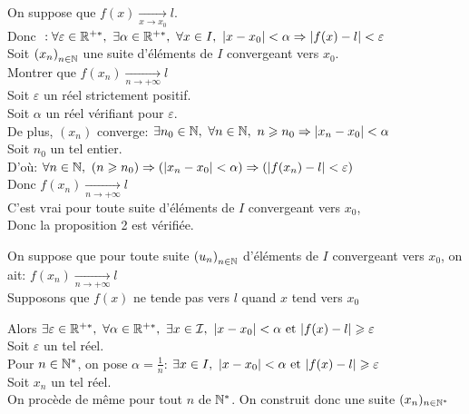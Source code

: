 \documentclass[12pt,twoside,a4paper]{article}
\begin{document}
		\begin{preuve}
			\begin{liste}
				\item On suppose que $f(x)\mathop{\longrightarrow}\limits_{x\rightarrow x_0} l$.\\
					Donc $\ :\forall \varepsilon \in\R^{+*},\ \exists\alpha\in\R^{+*},\ \forall x\in I,\ |x-x_0|<\alpha\Rightarrow |f(x)-l|<\varepsilon$\\
					Soit $\left( x_n\right) _{n\in\mathbb{N}}$ une suite d'\'el\'ements de $I$ convergeant vers $x_0$.\\
					Montrer que $f\left( x_n\right) \mathop{\longrightarrow}\limits_{n\rightarrow +\infty}l$\\
					Soit $\varepsilon$ un r\'eel strictement positif.\\
					Soit $\alpha$ un r\'eel v\'erifiant  pour $\varepsilon$.\\
					De plus, $\left( x_n\right) $ converge: $\exists n_0\in\N,\ \forall n\in\N,\ n\geqslant n_0\Rightarrow \left| x_n-x_0\right| <\alpha$\\
					Soit $n_0$ un tel entier.\\
					D'o\`u: $\forall n\in\mathbb{N},\ (n\geqslant n_0)\Rightarrow (\left| x_n-x_0\right| <\alpha) \Rightarrow (|f(x_n)-l|<\varepsilon)$\\
					Donc $f\left( x_n\right) \mathop{\longrightarrow}\limits_{n\rightarrow +\infty}l$\\
					C'est vrai pour toute suite d'\'el\'ements de $I$ convergeant vers $x_0$,\\
					Donc la proposition 2 est v\'erifi\'ee.
				\item On suppose que pour toute suite $\left(u_n \right)_{n\in\mathbb{N}}$ d'\'el\'ements de $I$ convergeant vers $x_0$, on ait: $f\left( x_n\right) \mathop{\longrightarrow}\limits_{n\rightarrow +\infty}l$\\
				 Supposons que $f(x)$ ne tende pas vers $l$ quand $x$ tend vers $x_0$
				\begin{tab}
					Alors $\exists \varepsilon\in\R^{+*},\ \forall \alpha\in\R^{+*},\ \exists x\in\I,\ |x-x_0|<\alpha\et|f(x)-l|\geqslant\varepsilon$\\
					Soit $\varepsilon$ un tel réel.\\
					Pour $n\in\mathbb{N}^{*}$, on pose $\alpha=\frac{1}{n}$: $\exists x\in I,\ |x-x_0|<\alpha\et|f(x)-l|\geqslant\varepsilon$\\
					Soit $x_n$ un tel réel.\\
					On procède de m\^eme pour tout $n$ de $\mathbb{N}^{*}$. On construit donc une suite $(x_n)_{n\in\mathbb{N}^{*}}$\\

\end{tab}
\end{liste}
\end{preuve}
\end{document}
